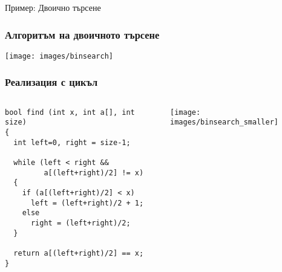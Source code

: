 \documentclass{beamer}
\begin{document}
\begin{frame}
\centerline{Пример: Двоично търсене}
\end{frame}

\begin{frame}[fragile]
\frametitle{Алгоритъм на двоичното търсене}

\texttt{[image: images/binsearch]} 

\end{frame}



\begin{frame}[fragile]
\frametitle{Реализация с цикъл}



\begin{columns}[t]
  \begin{column}{0.5\textwidth}

\begin{lstlisting}
bool find (int x, int a[], int size)
{
  int left=0, right = size-1;

  while (left < right && 
         a[(left+right)/2] != x)
  {
    if (a[(left+right)/2] < x)
      left = (left+right)/2 + 1;
    else
      right = (left+right)/2;
  }

  return a[(left+right)/2] == x;
}
\end{lstlisting}


  \end{column}
  \begin{column}{0.5\textwidth}
\vspace*{-1pt}
\hspace*{-50pt}
\texttt{[image: images/binsearch\_smaller]} 

  \end{column}
\end{columns}



\end{frame}
\end{document}
